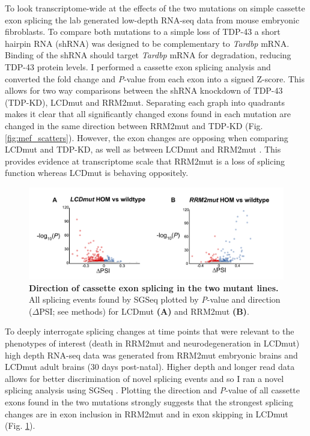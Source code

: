 To look transcriptome-wide at the effects of the two mutations on simple cassette exon splicing the lab generated low-depth RNA-seq data from mouse embryonic fibroblasts. 
To compare both mutations to a simple loss of TDP-43 a short hairpin RNA (shRNA) was designed to be complementary to \textit{Tardbp} mRNA.
Binding of the shRNA should target \textit{Tardbp} mRNA for degradation, reducing TDP-43 protein levels. 
I performed a cassette exon splicing analysis and converted the fold change and \textit{P}-value from each exon into a signed Z-score. 
This allows for two way comparisons  between the shRNA knockdown of TDP-43 (TDP-KD), LCDmut and RRM2mut. 
Separating each graph into quadrants makes it clear that all significantly changed exons found in each mutation are changed in the same direction between RRM2mut and TDP-KD (Fig. \ref{fig:mef_scatters}). 
However, the exon changes are opposing when comparing LCDmut and TDP-KD, as well as between LCDmut and RRM2mut . 
This provides evidence at transcriptome scale that RRM2mut is a loss of splicing function whereas LCDmut is behaving oppositely.

\begin{figure}[h]
	\centering
	\includegraphics[width=\textwidth]{Figures/05_tdp_mice/transcriptome_scatters.png}
	\caption[Direction of cassette exon splicing in the two mutant lines]{
		\textbf{Direction of cassette exon splicing in the two mutant lines.}
	All splicing events found by SGSeq plotted by \textit{P}-value and direction ($\Delta$PSI; see methods) for LCDmut \textbf{(A)} and RRM2mut \textbf{(B)}.
}
	\label{fig:cassette_scatters}
\end{figure}

To deeply interrogate splicing changes at time points that were relevant to the phenotypes of interest (death in RRM2mut and neurodegeneration in LCDmut) high depth RNA-seq data was generated from RRM2mut embryonic brains and LCDmut adult brains (30 days post-natal). 
Higher depth and longer read data allows for better discrimination of novel splicing events and so I ran a novel splicing analysis using SGSeq \citep{Goldstein2016}. 
Plotting the direction and \textit{P}-value of all cassette exons found in the two mutations strongly suggests that the strongest splicing changes are in exon inclusion in RRM2mut and in exon skipping in LCDmut (Fig. \ref{fig:cassette_scatters}).

